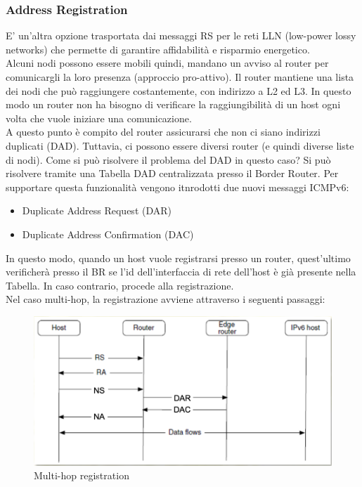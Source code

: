 \documentclass{article}
\begin{document}
\subsubsection{Address Registration}
E' un'altra opzione trasportata dai messaggi RS per le reti LLN (low-power lossy networks) che permette di garantire affidabilità e risparmio energetico.\\
Alcuni nodi possono essere mobili quindi, mandano un avviso al router per comunicargli la loro presenza (approccio pro-attivo). Il router mantiene una lista dei nodi che può raggiungere costantemente, con indirizzo a L2 ed L3. In questo modo un router non ha bisogno di verificare la raggiungibilità di un host ogni volta che vuole iniziare una comunicazione. \\
A questo punto è compito del router assicurarsi che non ci siano indirizzi duplicati (DAD). Tuttavia, ci possono essere diversi router (e quindi diverse liste di nodi). Come si può risolvere il problema del DAD in questo caso? Si può risolvere tramite una Tabella DAD centralizzata presso il Border Router. Per supportare questa funzionalità vengono itnrodotti due nuovi messaggi ICMPv6:
\begin{itemize}
    \item Duplicate Address Request (DAR)
    \item Duplicate Address Confirmation (DAC)
\end{itemize}
In questo modo, quando un host vuole registrarsi presso un router, quest'ultimo verificherà presso il BR se l'id dell'interfaccia di rete dell'host è già presente nella Tabella. In caso contrario, procede alla registrazione. \\ 
Nel caso multi-hop, la registrazione avviene attraverso i seguenti passaggi:
\begin{figure}[H]
\centering
\includegraphics[scale=0.7]{figures/multihop registration.PNG}
\caption{Multi-hop registration}
\end{figure}
\end{document}
